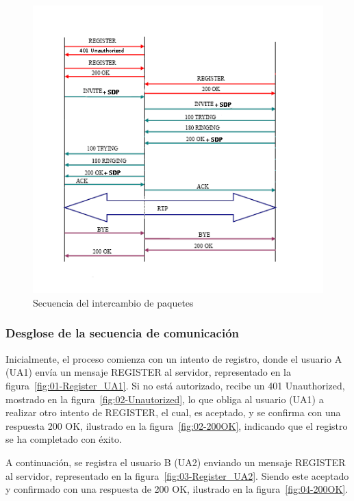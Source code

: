 \documentclass[a4paper, 12pt]{book}
\begin{document}
\begin{figure}
  \centering
  \includegraphics[width=15cm, keepaspectratio]{img/resultados/Secuencia_Paquetes.png}
  \caption{Secuencia del intercambio de paquetes}
  \label{fig:Secuencia_Paquetes}
\end{figure}

\subsubsection{Desglose de la secuencia de comunicación}
\label{subsubsec:secuencia_comunicación}

Inicialmente, el proceso comienza con un intento de registro, donde el usuario A (UA1) envía un mensaje REGISTER al servidor, 
representado en la figura~\ref{fig:01-Register_UA1}. 
Si no está autorizado, recibe un 401 Unauthorized, mostrado en la figura~\ref{fig:02-Unautorized}, 
lo que obliga al usuario (UA1) a realizar otro intento de REGISTER, el cual, es aceptado,
y se confirma con una respuesta 200 OK, ilustrado en la figura~\ref{fig:02-200OK}, 
indicando que el registro se ha completado con éxito.
\bigskip

A continuación, se registra el usuario B (UA2) enviando un mensaje REGISTER al servidor,
representado en la figura~\ref{fig:03-Register_UA2}. 
Siendo este aceptado y confirmado con una respuesta de 200 OK, ilustrado en la figura~\ref{fig:04-200OK}.
\bigskip
\end{document}
